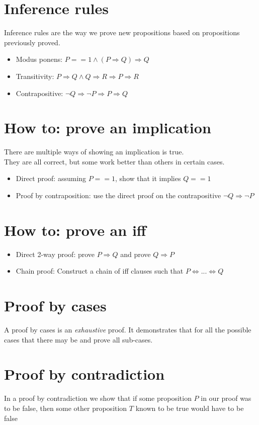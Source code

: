 \documentclass{report}
\newcommand{\implies}{\Rightarrow}
\begin{document}
    \section{Inference rules}
        Inference rules are the way we prove new propositions based on propositions previously proved. \\
        \begin{itemize}
            \item Modus ponens: $P == 1 \land \left(P \implies Q\right) \implies Q$
            \item Transitivity: $P \implies Q \land Q \implies R \implies P \implies R$
            \item Contrapositive: $\neg Q \implies \neg P \implies P \implies Q$
        \end{itemize}
    \section{How to: prove an implication}
        There are multiple ways of showing an implication is true. \\
        They are all correct, but some work better than others in certain cases.
        \begin{itemize}
            \item Direct proof: assuming $P == 1$, show that it implies $Q == 1$
            \item Proof by contraposition: use the direct proof on the contrapositive $\neg Q \implies \neg P$
        \end{itemize}
    \section{How to: prove an iff}
        \begin{itemize}
            \item Direct 2-way proof: prove $P \implies Q$ and prove $Q \implies P$
            \item Chain proof: Construct a chain of iff clauses such that $P \iff ... \iff Q$
        \end{itemize}
    \section{Proof by cases}
        A proof by cases is an \textit{exhaustive} proof. It demonstrates that 
        for all the possible cases that there may be and prove all sub-cases. 
    \section{Proof by contradiction}
        In a proof by contradiction we show that if some proposition $P$ in our 
        proof was to be false, then some other proposition $T$ known to be true 
        would have to be false 
\end{document}
